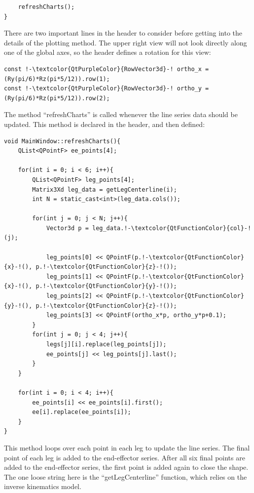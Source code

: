 \documentclass[12pt]{article}
\begin{document}
\begin{lstlisting}
    refreshCharts();
}
\end{lstlisting}
There are two important lines in the header to consider before getting into the details of the plotting method. The upper right view will not look directly along one of the global axes, so the header defines a rotation for this view:
\begin{lstlisting}
const !-\textcolor{QtPurpleColor}{RowVector3d}-! ortho_x = (Ry(pi/6)*Rz(pi*5/12)).row(1);
const !-\textcolor{QtPurpleColor}{RowVector3d}-! ortho_y = (Ry(pi/6)*Rz(pi*5/12)).row(2);
\end{lstlisting}
\newpage \noindent
The method ``refreshCharts'' is called whenever the line series data should be updated. This method is declared in the header, and then defined:
\begin{lstlisting}
void MainWindow::refreshCharts(){
    QList<QPointF> ee_points[4];

    for(int i = 0; i < 6; i++){
        QList<QPointF> leg_points[4];
        Matrix3Xd leg_data = getLegCenterline(i);
        int N = static_cast<int>(leg_data.cols());

        for(int j = 0; j < N; j++){
            Vector3d p = leg_data.!-\textcolor{QtFunctionColor}{col}-!(j);

            leg_points[0] << QPointF(p.!-\textcolor{QtFunctionColor}{x}-!(), p.!-\textcolor{QtFunctionColor}{z}-!());
            leg_points[1] << QPointF(p.!-\textcolor{QtFunctionColor}{x}-!(), p.!-\textcolor{QtFunctionColor}{y}-!());
            leg_points[2] << QPointF(p.!-\textcolor{QtFunctionColor}{y}-!(), p.!-\textcolor{QtFunctionColor}{z}-!());
            leg_points[3] << QPointF(ortho_x*p, ortho_y*p+0.1);
        }
        for(int j = 0; j < 4; j++){
            legs[j][i].replace(leg_points[j]);
            ee_points[j] << leg_points[j].last();
        }
    }

    for(int i = 0; i < 4; i++){
        ee_points[i] << ee_points[i].first();
        ee[i].replace(ee_points[i]);
    }
}
\end{lstlisting}
This method loops over each point in each leg to update the line series. The final point of each leg is added to the end-effector series. After all six final points are added to the end-effector series, the first point is added again to close the shape. The one loose string here is the ``getLegCenterline'' function, which relies on the inverse kinematics model.
\end{document}
